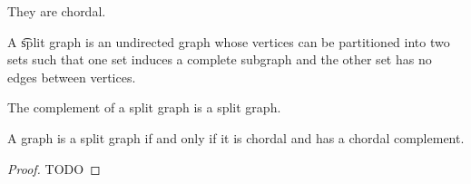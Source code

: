 

They are chordal.


A \t{split graph} is an undirected graph whose vertices can be partitioned into two sets such that one set induces a complete subgraph and the other set has no edges between vertices.


\begin{prop}

  The complement of a split graph is a split graph.

\end{prop}

\begin{prop}

  A graph is a split graph if and only if it is chordal and has a chordal complement.

\begin{proof}

  TODO

\end{proof}

\end{prop}
